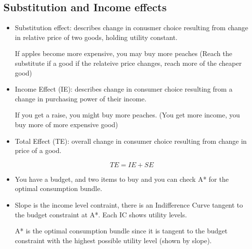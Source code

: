 \documentclass{article}
\begin{document}
\newpage
\subsection{Substitution and Income effects}
\begin{itemize}
  \item Substitution effect: describes change in conusmer choice resulting
    from change in relative price of two goods, holding utility constant.

    If apples become more expensive, you may buy more peaches
    (Reach the substitute if a good if the relateive price changes, reach more of the cheaper good)
  \item Income Effect (IE): describes change in consumer choice resulting from a change in purchasing power of their income.

    If you get a raise, you might buy more peaches.
    (You get more income, you buy more of more expensive good)
  \item Total Effect (TE): overall change in consumer choice resulting from change in price of a good.

    $$TE = IE + SE$$
  \item You have a budget, and two items to buy and you
    can check A* for the optimal consumption bundle.
  \item Slope is the income level contraint, there is an Indifference
    Curve tangent to the budget constraint at A*. Each IC shows utility levels.

    A* is the optimal consumption bundle since it is tangent to the budget constraint
    with the highest possible utility level (shown by slope).


\end{itemize}
\end{document}
